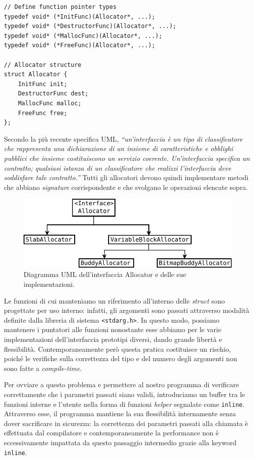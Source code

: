 \begin{lstlisting}
// Define function pointer types
typedef void* (*InitFunc)(Allocator*, ...);
typedef void* (*DestructorFunc)(Allocator*, ...);
typedef void* (*MallocFunc)(Allocator*, ...);  
typedef void* (*FreeFunc)(Allocator*, ...); 

// Allocator structure
struct Allocator {
    InitFunc init; 
    DestructorFunc dest;
    MallocFunc malloc;
    FreeFunc free; 
};
\end{lstlisting}

Secondo la più recente specifica UML, \textit{“un'interfaccia è un tipo di classificatore che rappresenta una dichiarazione di un insieme di caratteristiche e obblighi pubblici che insieme costituiscono un servizio coerente. Un'interfaccia specifica un contratto; qualsiasi istanza di un classificatore che realizzi l'interfaccia deve soddisfare tale contratto.”} Tutti gli allocatori devono quindi implementare metodi che abbiano \textit{signature} corrispondente e che svolgano le operazioni elencate sopra.

\begin{figure}[H]
    \centering
    \includegraphics[width=1\textwidth]{images/allocator_interface_uml.pdf}
    \caption{Diagramma UML dell'interfaccia Allocator e delle sue implementazioni.}
    \label{fig:uml_allocator_interface}
\end{figure}

Le funzioni di cui manteniamo un riferimento all'interno delle \textit{struct} sono progettate per uso interno: infatti, gli argomenti sono passati attraverso modalità definite dalla libreria di sistema \texttt{<stdarg.h>}. In questo modo, possiamo mantenere i puntatori alle funzioni nonostante esse abbiamo per le varie implementazioni dell'interfaccia prototipi diversi, dando grande libertà e flessibilità. Contemporaneamente però questa pratica costituisce un rischio, poiché le verifiche sulla correttezza del tipo e del numero degli argomenti non sono fatte a \textit{compile-time}.

Per ovviare a questo problema e permettere al nostro programma di verificare correttamente che i parametri passati siano validi, introduciamo un buffer tra le funzioni interne e l’utente nella forma di funzioni \textit{helper} segnalate come \texttt{inline}. Attraverso esse, il programma mantiene la sua flessibilità internamente senza dover sacrificare in sicurezza: la correttezza dei parametri passati alla chiamata è effettuata dal compilatore e contemporaneamente la performance non è eccessivamente impattata da questo passaggio intermedio grazie alla keyword \texttt{inline}. 

